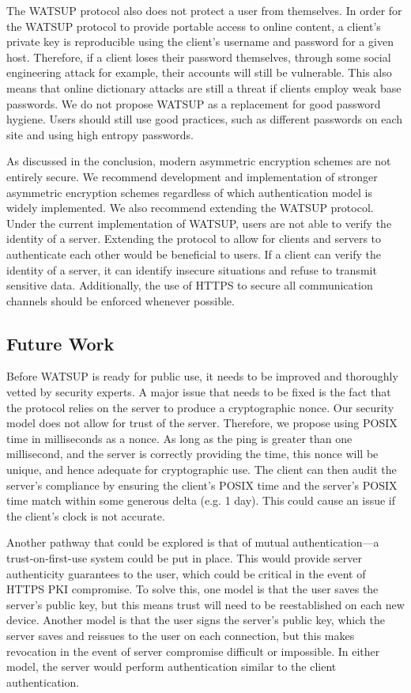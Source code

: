 The WATSUP protocol also does not protect a user from themselves. In order for the WATSUP protocol to provide portable access to online content, a client's private key is reproducible using the client's username and password for a given host. Therefore, if a client loses their password themselves, through some social engineering attack for example, their accounts will still be vulnerable. This also means that online dictionary attacks are still a threat if clients employ weak base passwords. We do not propose WATSUP as a replacement for good password hygiene. Users should still use good practices, such as different passwords on each site and using high entropy passwords.

As discussed in the conclusion, modern asymmetric encryption schemes are not entirely secure. We recommend development and implementation of stronger asymmetric encryption schemes regardless of which authentication model is widely implemented. We also recommend extending the WATSUP protocol. Under the current implementation of WATSUP, users are not able to verify the identity of a server. Extending the protocol to allow for clients and servers to authenticate each other would be beneficial to users. If a client can verify the identity of a server, it can identify insecure situations and refuse to transmit sensitive data. Additionally, the use of HTTPS to secure all communication channels should be enforced whenever possible.

\subsection{Future Work}

Before WATSUP is ready for public use, it needs to be improved and thoroughly vetted by security experts. A major issue that needs to be fixed is the fact that the protocol relies on the server to produce a cryptographic nonce. Our security model does not allow for trust of the server. Therefore, we propose using POSIX time in milliseconds as a nonce. As long as the ping is greater than one millisecond, and the server is correctly providing the time, this nonce will be unique, and hence adequate for cryptographic use. The client can then audit the server's compliance by ensuring the client's POSIX time and the server's POSIX time match within some generous delta (e.g. 1 day). This could cause an issue if the client's clock is not accurate.

Another pathway that could be explored is that of mutual authentication---a trust-on-first-use system could be put in place. This would provide server authenticity guarantees to the user, which could be critical in the event of HTTPS PKI compromise. To solve this, one model is that the user saves the server's public key, but this means trust will need to be reestablished on each new device. Another model is that the user signs the server's public key, which the server saves and reissues to the user on each connection, but this makes revocation in the event of server compromise difficult or impossible. In either model, the server would perform authentication similar to the client authentication.

